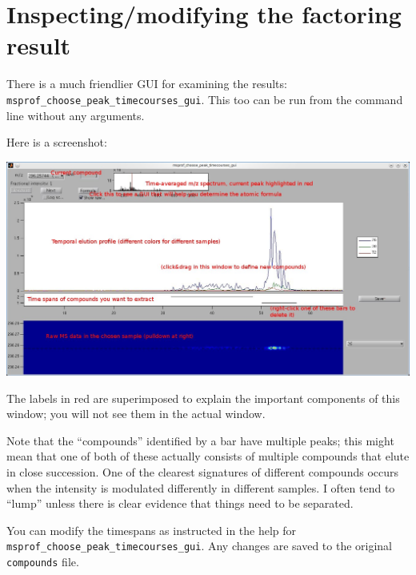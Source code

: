 \documentclass[notitlepage]{revtex4-1}
\begin{document}
\section{Inspecting/modifying the factoring result}

There is a much friendlier GUI for examining the results:  \verb|msprof_choose_peak_timecourses_gui|.  This too can be run from the command line without any arguments.

Here is a screenshot:
\begin{center}
\includegraphics[width=6in]{figures/choosepeakGUI_edit.jpeg}
\end{center}
The labels in red are superimposed to explain the important components of this window; you will not see them in the actual window.

Note that the ``compounds'' identified by a bar have multiple peaks; this might mean that one of both of these actually consists of multiple compounds that elute in close succession.  One of the clearest signatures of different compounds occurs when the intensity is modulated differently in different samples.  I often tend to ``lump'' unless there is clear evidence that things need to be separated.

You can modify the timespans as instructed in the help for \verb|msprof_choose_peak_timecourses_gui|.  Any changes are saved to the original \verb|compounds| file.
\end{document}
